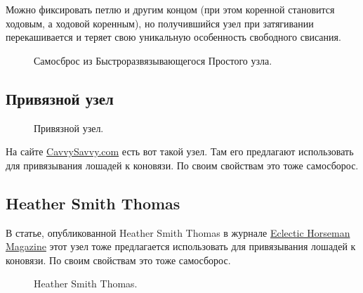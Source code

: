 Можно фиксировать петлю и другим концом (при этом коренной становится ходовым, а ходовой коренным), но получившийся узел при затягивании перекашивается и теряет свою уникальную особенность свободного свисания.

\begin{figure}[H]\centering
	\subfloat[Завязывание]{\label{ris:Arbor_samosbros_2_1}
	\tcbox[enhanced jigsaw,colframe=black,opacityframe=0.5,opacityback=0.5,height=6cm]
		{\centering
			}
		}
\hfil
	\subfloat[Результат]{\label{ris:Arbor_samosbros_2_2}
	\tcbox[enhanced jigsaw,colframe=black,opacityframe=0.5,opacityback=0.5,height=6cm]
		{\centering
			}
		}
	\caption{Самосброс из Быстроразвязывающегося Простого узла.}\label{ris:Arbor_samosbros}
\end{figure}

\subsection{Привязной узел}

\begin{figure}[H]\centering
	\subfloat[Завязывание]{\label{ris:CavvySavvy_1}
	\tcbox[enhanced jigsaw,colframe=black,opacityframe=0.5,opacityback=0.5]
		{\centering
			}
		}
\hfil
	\subfloat[Результат]{\label{ris:CavvySavvy_2}
	\tcbox[enhanced jigsaw,colframe=black,opacityframe=0.5,opacityback=0.5]
		{\centering
			}
		}
	\caption{Привязной узел.}\label{ris:CavvySavvy}
\end{figure}

На сайте \href{https://cavvysavvy.tsln.com/blog/knots-tying-horse/}{CavvySavvy.com} есть вот такой узел. Там его предлагают использовать для привязывания лошадей к коновязи. По своим свойствам это тоже самосборос.

\subsection{Heather Smith Thomas}

В статье, опубликованной Heather Smith Thomas в журнале \href{http://eclectic-horseman.com/}{Eclectic Horseman Magazine} этот узел тоже предлагается использовать для привязывания лошадей к коновязи. По своим свойствам это тоже самосборос.

\begin{figure}[H]\centering
	\begin{minipage}{1\linewidth}
		\begin{center}
			\tcbox[enhanced jigsaw,colframe=black,opacityframe=0.5,opacityback=0.5]
			{\centering{}}
		\end{center}
	\end{minipage}
\caption{Heather Smith Thomas.}
\label{ris:Heather_Smith_Thomas}
\end{figure}

